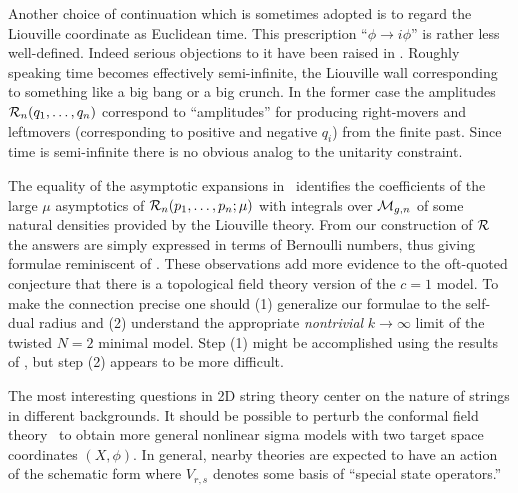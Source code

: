 Another choice of continuation which is sometimes adopted is to regard
the Liouville coordinate as Euclidean time. This prescription
``$\phi \to i \phi$'' is rather less well-defined. Indeed
serious objections to it have been raised in \joetalk. 
Roughly speaking time becomes effectively semi-infinite, 
the Liouville wall corresponding to something like a big bang
or a big crunch. In the former case the amplitudes 
${\cal R}_n(q_1,\dots ,q_n)$ 
correspond to ``amplitudes'' for producing right-movers and 
leftmovers (corresponding to positive and negative $q_i$)
from the finite past. Since time is semi-infinite there is no 
obvious analog to the unitarity constraint.
 
 
The equality of the asymptotic expansions in \modspace\ identifies
the coefficients of the large $\mu$ asymptotics of 
${\cal R}_n(p_1,\dots ,p_n;\mu)$ with integrals 
over ${\cal M}_{g,n}$ of some natural densities provided by the 
Liouville theory. From our construction of 
${\cal R}$ the answers are simply expressed in terms of Bernoulli 
numbers, thus giving formulae reminiscent of 
\nref{}%
\nref{}%
. 
These observations add more 
evidence to the oft-quoted conjecture that there is a 
topological field theory version of the $c=1$ model.
To make the connection precise one should (1) generalize our 
formulae to the self-dual radius  and (2) understand the appropriate
{\it nontrivial} $k\to \infty$ limit of the twisted $N=2$ minimal model.
Step (1) might be accomplished 
using the results of 
\nref{}%
\nref{}%
, 
but step (2) appears to be more 
difficult.  
 
 
The most interesting questions in 2D string 
theory center on the nature of strings in different 
backgrounds. It should be possible to perturb the 
conformal field theory \confld\ to obtain more general
nonlinear sigma models with two target space
coordinates $(X,\phi)$. In general, nearby theories
are expected to have an action of the schematic form
\eqn{}
where $V_{r,s}$ denotes some basis of ``special state operators.''
 
